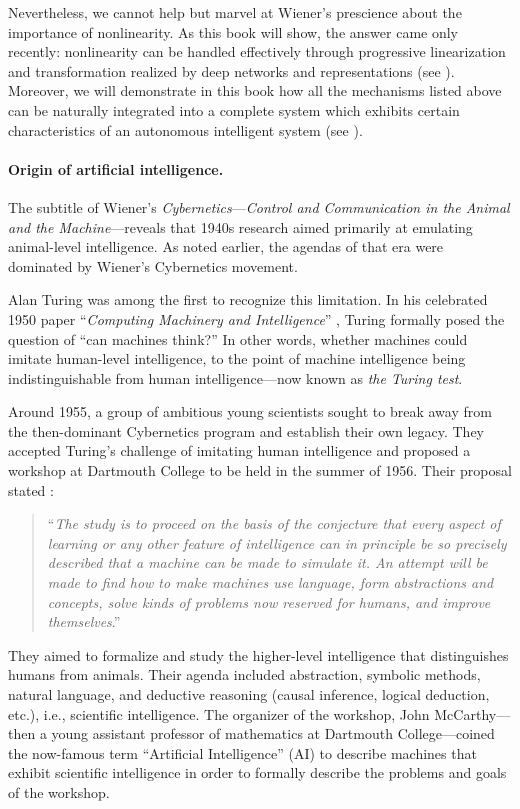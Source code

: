 \documentclass[../../book-main.tex]{subfiles}
\begin{document}
Nevertheless, we cannot help but marvel at Wiener's prescience about
the importance of nonlinearity. As this book will show, the answer
came only recently: nonlinearity can be handled effectively through
progressive linearization and transformation realized by deep
networks and representations (see ).
Moreover, we will demonstrate in this book how all the mechanisms
listed above can be naturally integrated into a complete system which
exhibits certain characteristics of an autonomous intelligent system
(see ).

\paragraph{Origin of artificial intelligence.}
The subtitle of Wiener's \textit{Cybernetics}---\textit{Control and
Communication in the Animal and the Machine}---reveals that 1940s
research aimed primarily at emulating animal-level intelligence. As
noted earlier, the agendas of that era were dominated by Wiener's
Cybernetics movement.

Alan Turing was among the first to recognize this limitation. In his
celebrated 1950 paper ``\textit{Computing Machinery and
Intelligence}'' \cite{Turing-1950}, Turing formally posed the
question of ``can machines think?'' In other words,
 whether machines could imitate human-level intelligence,
to the point of machine intelligence being indistinguishable from
human intelligence---now known as \textit{the Turing test}.

Around 1955, a group of ambitious young scientists sought to break
away from the then-dominant Cybernetics program and establish their
own legacy. They accepted Turing's challenge of imitating human
intelligence and proposed a workshop at Dartmouth College to be held
in the summer of 1956. Their proposal stated \cite{McCarthy-1955}:
\begin{quote}
    ``\textit{The study is to proceed on the basis of the conjecture
        that every aspect of learning or any other feature of
        intelligence can in principle be so precisely described that a
        machine can be made to simulate it. An attempt will be made to
        find how to make machines use language, form abstractions and
        concepts, solve kinds of problems now reserved for humans, and
    improve themselves}.''
\end{quote}
They aimed to formalize and study the higher-level intelligence that
distinguishes humans from animals. Their agenda included abstraction,
symbolic methods, natural language, and deductive reasoning (causal
inference, logical deduction, etc.), i.e., scientific intelligence.
The organizer of the workshop, John McCarthy---then a young assistant
professor of mathematics at Dartmouth College---coined the now-famous
term ``Artificial Intelligence'' (AI) to describe machines that
exhibit scientific intelligence in order to formally describe the
problems and goals of the workshop. 
\end{document}
